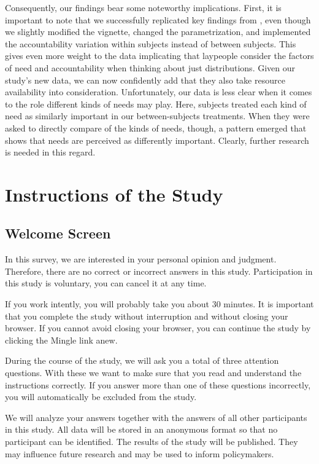 \documentclass[egregdoesnotlikesansseriftitles]{scrartcl}
\begin{document}
Consequently, our findings bear some noteworthy implications.
First, it is important to note that we successfully replicated key findings from \cite{bauer_need_2020}, even though we slightly modified the vignette, changed the parametrization, and implemented the accountability variation within subjects instead of between subjects.
This gives even more weight to the data implicating that laypeople consider the factors of need and accountability when thinking about just distributions.
Given our study's new data, we can now confidently add that they also take resource availability into consideration.
Unfortunately, our data is less clear when it comes to the role different kinds of needs may play.
Here, subjects treated each kind of need as similarly important in our between-subjects treatments.
When they were asked to directly compare of the kinds of needs, though, a pattern emerged that shows that needs are perceived as differently important.
Clearly, further research is needed in this regard.


\clearpage




\clearpage
\appendix
\section{Instructions of the Study}\label{sec:app_instructions}
\subsection*{Welcome Screen}
In this survey, we are interested in your personal opinion and judgment.
Therefore, there are no correct or incorrect answers in this study.
Participation in this study is voluntary, you can cancel it at any time.

If you work intently, you will probably take you about 30 minutes.
It is important that you complete the study without interruption and without closing your browser.
If you cannot avoid closing your browser, you can continue the study by clicking the Mingle link anew.

During the course of the study, we will ask you a total of three attention questions.
With these we want to make sure that you read and understand the instructions correctly.
If you answer more than one of these questions incorrectly, you will automatically be excluded from the study.

We will analyze your answers together with the answers of all other participants in this study.
All data will be stored in an anonymous format so that no participant can be identified.
The results of the study will be published.
They may influence future research and may be used to inform policymakers.
\end{document}
